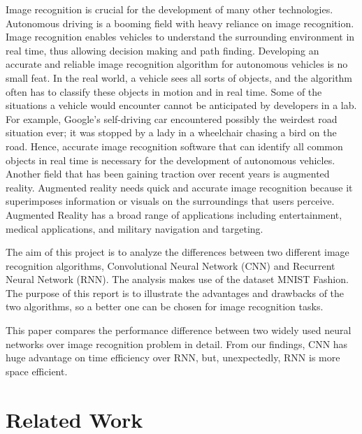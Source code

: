 \documentclass[letterpaper]{article} %
\begin{document}
 Image recognition is crucial for the development of many other technologies. Autonomous driving is a booming field with heavy reliance on image recognition. Image recognition enables vehicles to understand the surrounding environment in real time, thus allowing decision making and path finding. Developing an accurate and reliable image recognition algorithm for autonomous vehicles is no small feat. In the real world, a vehicle sees all sorts of objects, and the algorithm often has to classify these objects in motion and in real time. Some of the situations a vehicle would encounter cannot be anticipated by developers in a lab. For example, Google’s self-driving car encountered possibly the weirdest road situation ever; it was stopped by a lady in a wheelchair chasing a bird on the road. \cite{birdchasing2017} Hence, accurate image recognition software that can identify all common objects in real time is necessary for the development of autonomous vehicles. Another field that has been gaining traction over recent years is augmented reality. Augmented reality needs quick and accurate image recognition because it superimposes information or visuals on the surroundings that users perceive. Augmented Reality has a broad range of applications including entertainment, medical applications, and military navigation and targeting. \cite{ronald2006ar}

The aim of this project is to analyze the differences between two different image recognition algorithms, Convolutional Neural Network (CNN) and Recurrent Neural Network (RNN). The analysis makes use of the dataset MNIST Fashion. The purpose of this report is to illustrate the advantages and drawbacks of the two algorithms, so a better one can be chosen for image recognition tasks.

This paper compares the performance difference between two widely used neural networks over image recognition problem in detail. From our findings, CNN has huge advantage on time efficiency over RNN, but, unexpectedly, RNN is more space efficient.


\section{Related Work}
\end{document}
